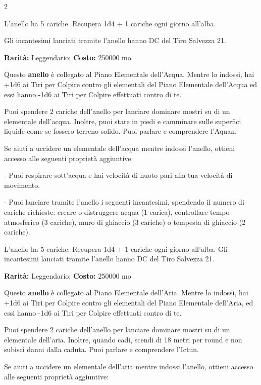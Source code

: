 \begin{multicols}{2}
\medskip

L'anello ha 5 cariche. Recupera 1d4 + 1 cariche ogni giorno all'alba.

Gli incantesimi lanciati tramite l'anello hanno DC del Tiro Salvezza 21.


\textbf{Rarità:} Leggendario; \textbf{Costo:} 250000 mo

Questo \textbf{anello} è collegato al Piano Elementale dell'Acqua. Mentre lo indossi, hai +1d6 ai Tiri per Colpire contro gli elementali del Piano Elementale dell'Acqua ed essi hanno -1d6 ai Tiri per Colpire effettuati contro di te.

Puoi spendere 2 cariche dell'anello per lanciare dominare mostri su di un elementale dell'acqua. Inoltre, puoi stare in piedi e camminare sulle superfici liquide come se fossero terreno solido. Puoi parlare e comprendere l'Aquan.

Se aiuti a uccidere un elementale dell'acqua mentre indossi l'anello, ottieni accesso alle seguenti proprietà aggiuntive:

\smallskip- Puoi respirare sott'acqua e hai velocità di nuoto pari alla tua velocità di movimento.

\smallskip- Puoi lanciare tramite l'anello i seguenti incantesimi, spendendo il numero di cariche richieste: creare o distruggere acqua (1 carica), controllare tempo atmosferico (3 cariche), muro di ghiaccio (3 cariche) o tempesta di ghiaccio (2 cariche).

\medskip
L'anello ha 5 cariche. Recupera 1d4 + 1 cariche ogni giorno all'alba. Gli incantesimi lanciati tramite l'anello hanno DC del Tiro Salvezza 21.


\textbf{Rarità:} Leggendario; \textbf{Costo:} 250000 mo

Questo \textbf{anello} è collegato al Piano Elementale dell'Aria. Mentre lo indossi, hai +1d6 ai Tiri per Colpire contro gli elementali del Piano Elementale dell'Aria, ed essi hanno -1d6 ai Tiri per Colpire effettuati contro di te.

Puoi spendere 2 cariche dell'anello per lanciare dominare mostri su di un elementale dell'aria. Inoltre, quando cadi, scendi di 18 metri per round e non subisci danni dalla caduta. Puoi parlare e comprendere l'Ictun.

Se aiuti a uccidere un elementale dell'aria mentre indossi l'anello, ottieni accesso alle seguenti proprietà aggiuntive:


\end{multicols}
